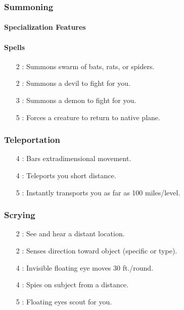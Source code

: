 \subsubsection{Summoning}
\paragraph{Specialization Features}
\paragraph{Spells}
\begin{itemize}
 \item[2] : Summons swarm of bats, rats, or spiders.
 \item[2] : Summons a devil to fight for you.
 \item[3] : Summons a demon to fight for you.
 \item[5] : Forces a creature to return to native plane.
\end{itemize}

\subsubsection{Teleportation}
\begin{itemize}
 \item[4] : Bars extradimensional movement.
 \item[4] : Teleports you short distance.
 \item[5] : Instantly transports you as far as 100 miles/level.
\end{itemize}


\subsubsection{Scrying}
\begin{itemize}
 \item[2] : See and hear a distant location.
 \item[2] : Senses direction toward object (specific or type).
 \item[4] : Invisible floating eye moves 30 ft./round.
 \item[4] : Spies on subject from a distance.
 \item[5] : Floating eyes scout for you.
\end{itemize}

